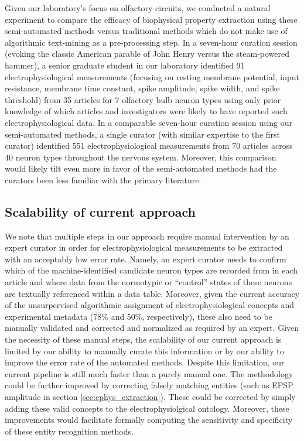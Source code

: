 \documentclass{template/frontiersSCNS} %
\begin{document}
Given our laboratory's focus on olfactory circuits, we conducted a natural experiment to compare the efficacy of biophysical property extraction using these semi-automated methods versus traditional methods which do not make use of algorithmic text-mining as a pre-processing step.  
In a seven-hour curation session (evoking the classic American parable of John Henry versus the steam-powered hammer), a senior graduate student in our laboratory identified 91 electrophysiological measurements (focusing on resting membrane potential, input resistance, membrane time constant, spike amplitude, spike width, and spike threshold) from 35 articles for 7 olfactory bulb neuron types using only prior knowledge of which articles and investigators were likely to have reported such electrophysiological data.  
In a comparable seven-hour curation session using our semi-automated methods, a single curator (with similar expertise to the first curator) identified 551 electrophysiological measurements from 70 articles across 40 neuron types throughout the nervous system.  
Moreover, this comparison would likely tilt even more in favor of the semi-automated methods had the curators been less familiar with the primary literature.

\subsection{Scalability of current approach}
We note that multiple steps in our approach require manual intervention by an expert curator in order for electrophysiological measurements to be extracted with an acceptably low error rate.  
Namely, an expert curator needs to confirm which of the machine-identified candidate neuron types are recorded from in each article and where data from the normotypic or ``control'' states of these neurons are textually referenced within a data table.  
Moreover, given the current accuracy of the unsurpervised algorithmic assignment of electrophysiological concepts and experimental metadata (78\% and 50\%, respectively), these also need to be manually validated and corrected and normalized as required by an expert.  
Given the necessity of these manual steps, the scalability of our current approach is limited by our ability to manually curate this information or by our ability to improve the error rate of the automated methods.  
Despite this limitation, our current pipeline is still much faster than a purely manual one.  The methodology could be further improved by correcting falsely matching entities (such as EPSP amplitude in section \ref{sec:ephys_extraction}).
These could be corrected by simply adding these valid concepts to the electrophysiolgical ontology.  
Moreover, these improvements would facilitate formally computing the sensitivity and specificity of these entity recognition methods.
\end{document}

